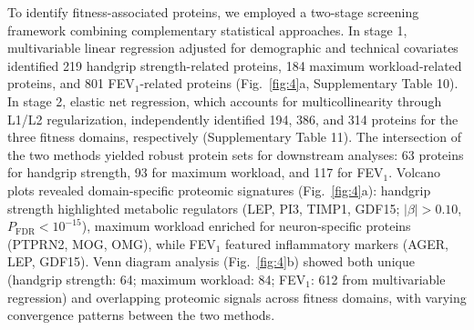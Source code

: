\documentclass{article}
\begin{document}
To identify fitness-associated proteins, we employed a two-stage screening framework combining complementary statistical approaches. In stage 1, multivariable linear regression adjusted for demographic and technical covariates identified 219 handgrip strength-related proteins, 184 maximum workload-related proteins, and 801 FEV$_1$-related proteins (Fig.~\ref{fig:4}a, Supplementary Table 10). In stage 2, elastic net regression, which accounts for multicollinearity through L1/L2 regularization, independently identified 194, 386, and 314 proteins for the three fitness domains, respectively (Supplementary Table 11). The intersection of the two methods yielded robust protein sets for downstream analyses: 63 proteins for handgrip strength, 93 for maximum workload, and 117 for FEV$_1$. Volcano plots revealed domain-specific proteomic signatures (Fig.~\ref{fig:4}a): handgrip strength highlighted metabolic regulators (LEP, PI3, TIMP1, GDF15; $|\beta| > 0.10$, $P_{\text{FDR}} < 10^{-15}$), maximum workload enriched for neuron-specific proteins (PTPRN2, MOG, OMG), while FEV$_1$ featured inflammatory markers (AGER, LEP, GDF15). Venn diagram analysis (Fig.~\ref{fig:4}b) showed both unique (handgrip strength: 64; maximum workload: 84; FEV$_1$: 612 from multivariable regression) and overlapping proteomic signals across fitness domains, with varying convergence patterns between the two methods.
\end{document}
